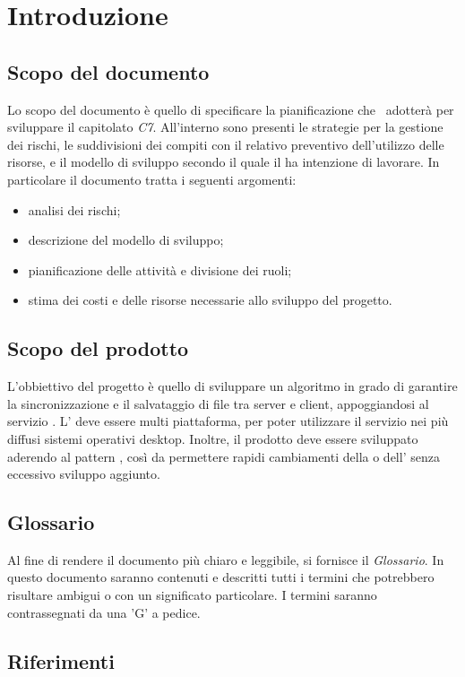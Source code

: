 \section{Introduzione}
\subsection{Scopo del documento}
Lo scopo del documento è quello di specificare la pianificazione che \Gruppo \, adotterà per sviluppare il capitolato \textit{C7}. All'interno sono presenti le strategie per la gestione dei rischi, le suddivisioni dei compiti con il relativo preventivo dell'utilizzo delle risorse, e il modello di sviluppo secondo il quale il  ha intenzione di lavorare.
In particolare il documento tratta i seguenti argomenti:
\begin{itemize}
\item analisi dei rischi;
\item descrizione del modello di sviluppo;
\item pianificazione delle attività e divisione dei ruoli;
\item stima dei costi e delle risorse necessarie allo sviluppo del progetto.
\end{itemize}
\subsection{Scopo del prodotto}
L'obbiettivo del progetto è quello di sviluppare un algoritmo in grado di garantire la sincronizzazione e il salvataggio di file tra server e client, appoggiandosi al servizio \textit{}.
L' deve essere multi piattaforma, per poter utilizzare il servizio nei più diffusi sistemi operativi desktop.
Inoltre, il prodotto deve essere sviluppato aderendo al pattern , così da permettere rapidi cambiamenti della  o dell' senza eccessivo sviluppo aggiunto.
\subsection{Glossario}
Al fine di rendere il documento più chiaro e leggibile, si fornisce il \textit{Glossario}. In questo documento saranno contenuti e descritti tutti i termini che potrebbero risultare ambigui o con un significato particolare. I termini saranno contrassegnati da una 'G' a pedice.
\subsection{Riferimenti}
